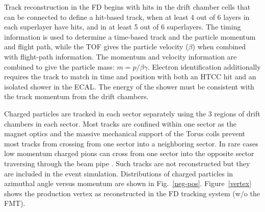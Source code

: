\documentclass[final,3p,twocolumn]{elsarticle}
\begin{document}
Track reconstruction in the FD begins with hits in the drift chamber cells that can be connected to define a 
hit-based track, when at least 4 out of 6 layers in each superlayer have hits, and in at least   
5 out of 6 superlayers. The timing information is used to determine a time-based track and the particle 
momentum and 
flight path, while the TOF gives the particle velocity ($\beta$) when combined with flight-path information. The 
momentum and velocity information are combined to give the particle mass: $m = p/\beta\gamma$. Electron 
identification additionally requires the track to match in time and position with both an HTCC hit and an isolated 
shower in the ECAL. The energy of the shower must be consistent with the track momentum from the drift chambers.  

Charged particles are tracked in each sector separately using the 3 regions of drift chambers in each sector. 
Most tracks are confined within one sector as the magnet optics and the massive mechanical support 
of the Torus coils prevent most tracks from crossing from one sector into a neighboring sector. 
In rare cases low momentum charged pions can cross from one sector into the opposite sector traversing through the beam pipe . Such tracks are not reconstructed but they are included in the event simulation. 
Distributions of charged particles in azimuthal angle versus momentum are shown in Fig.~\ref{neg-pos}.  
Figure~\ref{vertex} shows the production vertex as reconstructed in the FD tracking system (w/o the FMT). 
\end{document}
